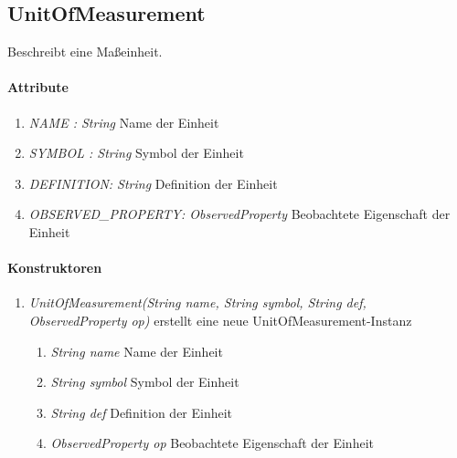 \subsection{UnitOfMeasurement}
Beschreibt eine Maßeinheit.

\paragraph{Attribute}
\begin{enumerate}[$\bullet$]
	\item \textit{NAME : String} Name der Einheit
	\item \textit{SYMBOL : String} Symbol der Einheit
	\item \textit{DEFINITION: String} Definition der Einheit
	\item \textit{OBSERVED\_PROPERTY: ObservedProperty} Beobachtete Eigenschaft der Einheit
\end{enumerate}

\paragraph{Konstruktoren}
\begin{enumerate}[+]
	\item \textit{ UnitOfMeasurement(String name, String symbol, String def, ObservedProperty op)}
	erstellt eine neue UnitOfMeasurement-Instanz
	\begin{enumerate}[$\bullet$]
		\item \textit{String name} Name der Einheit
		\item \textit{String symbol} Symbol der Einheit
		\item \textit{String def} Definition der Einheit
		\item \textit{ObservedProperty op} Beobachtete Eigenschaft der Einheit
	\end{enumerate}
	
\end{enumerate}
